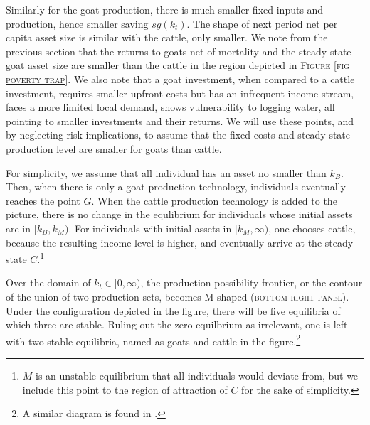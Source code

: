 	Similarly for the goat production, there is much smaller fixed inputs and production, hence smaller saving $sg(k_{t})$. The shape of next period net per capita asset size is similar with the cattle, only smaller. We note from the previous section that the returns to goats net of mortality and the steady state goat asset size are smaller than the cattle in the region depicted in \textsc{\small Figure \ref{fig poverty trap}}. We also note that a goat investment, when compared to a cattle investment, requires smaller upfront costs but has an infrequent income stream, faces a more limited local demand, shows vulnerability to logging water, all pointing to smaller investments and their returns. We will use these points, and by neglecting risk implications, to assume that the fixed costs and steady state production level are smaller for goats than cattle.  

	For simplicity, we assume that all individual has an asset no smaller than $k_{B}$. Then, when there is only a goat production technology, individuals eventually reaches the point $G$. When the cattle production technology is added to the picture, there is no change in the equlibrium for individuals whose initial assets are in $[k_{B}, k_{M})$. For individuals with initial assets in $[k_{M}, \infty)$, one chooses cattle, because the resulting income level is higher, and eventually arrive at the steady state $C$.\footnote{$M$ is an unstable equilibrium that all individuals would deviate from, but we include this point to the region of attraction of $C$ for the sake of simplicity. } 

	Over the domain of $k_{t}\in[0, \infty)$, the production possibility frontier, or the contour of the union of two production sets, becomes M-shaped (\textsc{bottom right panel}). Under the configuration depicted in the figure, there will be five equilibria of which three are stable. Ruling out the zero equilbrium as irrelevant, one is left with two stable equilibria, named as goats and cattle in the figure.\footnote{A similar diagram is found in \citet[][Figure 3, with $k-y$ space]{KraayMcKenzie2014}. }

